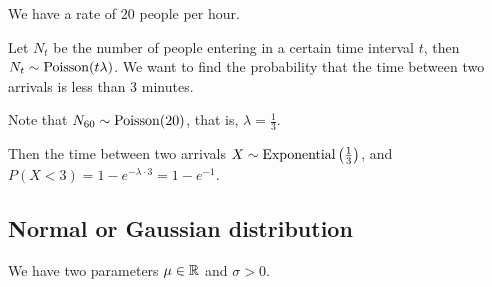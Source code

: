 \documentclass[14pt]{extarticle}
\newcommand{\Poisson}{{\operatorfont Poisson}}
\newcommand{\Exponential}{{\operatorfont Exponential}}
\begin{document}
\begin{example}
    We have a rate of 20 people per hour.

    Let $N_t$ be the number of people entering in a certain time interval $t$, then $N_t \sim \Poisson(t \lambda)$.
    We want to find the probability that the time between two arrivals is less than 3 minutes.

    Note that $N_{60} \sim \Poisson(20)$, that is, $\lambda = \frac{1}{3}$.

    Then the time between two arrivals $X \sim \Exponential\left(\frac{1}{3}\right)$, and $P(X < 3) = 1 - e^{-\lambda \cdot 3} = 1 - e^{-1}$.
\end{example}

\subsection{Normal or Gaussian distribution}
\label{sec:normal_distribution}

We have two parameters $\mu \in \mathbb{R}$ and $\sigma > 0$.
\end{document}
